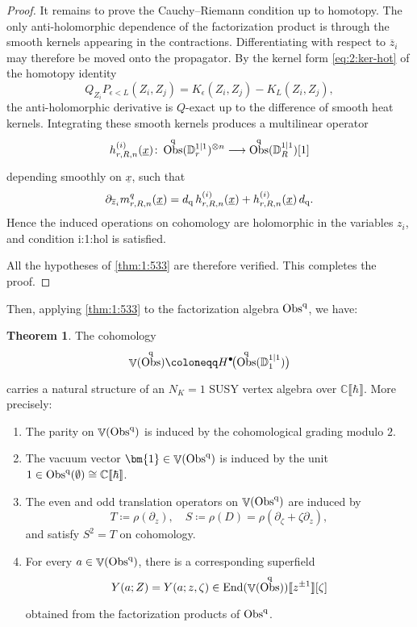 \documentclass[final,reqno]{amsart}
\numberwithin{equation}{section}
\theoremstyle{definition}
\newtheorem{thm}{Theorem}[section]
\newcommand{\ep}{\epsilon}
\newcommand{\ol}{\overline}
\newcommand{\ul}{\underline}
\newcommand{\ceq}{\coloneqq} %
\newcommand{\lto}{\longrightarrow}
\newcommand{\q}{\textup{q}}
\newcommand{\bbC}{\mathbb{C}}
\newcommand{\sD}{\mathbb{D}^{1|1}}
\newcommand{\pd}{\partial}
\newcommand{\vac}{\bm{1}}
\newcommand{\dbr}[1]{\llbracket #1 \rrbracket} %
\newcommand{\qObs}[1]{\mathop{\Obs^{\textup{q}}_{#1}}}
\DeclareMathOperator{\bbV}{\mathbb{V}}
\DeclareMathOperator{\End}{End}
\DeclareMathOperator{\Obs}{Obs}
\begin{document}
\begin{proof}
It remains to prove the Cauchy--Riemann condition up to homotopy. 
The only anti-holomorphic dependence of the factorization product is 
through the smooth kernels appearing in the contractions. 
Differentiating with respect to $\ol{z}_i$ 
may therefore be moved onto the propagator. 
By the kernel form \eqref{eq:2:ker-hot} of the homotopy identity
\[
 Q_{Z_i}P_{\ep<L}(Z_i,Z_j) = K_{\ep}(Z_i,Z_j)-K_L(Z_i,Z_j),
\]
the anti-holomorphic derivative is $Q$-exact 
up to the difference of smooth heat kernels. 
Integrating these smooth kernels produces a multilinear operator
\[
 h^{(i)}_{r,R,n}(\ul{x})\colon 
 \qObs{}(\sD_r)^{\otimes n} \lto \qObs{}(\sD_R)[1]
\]
depending smoothly on $\ul{x}$, such that
\[
 \pd_{\ol z_i}m^q_{r,R,n}(\ul{x}) = 
 d_{\q}\,h^{(i)}_{r,R,n}(\ul{x}) + h^{(i)}_{r,R,n}(\ul{x})\,d_{\q}.
\]
Hence the induced operations on cohomology are holomorphic 
in the variables $z_i$, and condition {i:1:hol} is satisfied.

All the hypotheses of \cref{thm:1:533} are therefore verified. 
This completes the proof.
\end{proof}

Then, applying \cref{thm:1:533} to the factorization algebra $\qObs{}$, 
we have:

\begin{thm}\label{thm:2:qObsVA}
The cohomology 
\[
 \bbV(\qObs{}) \ceq H^\bullet\!\bigl(\qObs{}(\sD_1)\bigr)
\]
carries a natural structure of 
an $N_K=1$ SUSY vertex algebra over $\bbC\dbr{\hbar}$.
More precisely:
\begin{enumerate}
\item 
The parity on $\bbV(\qObs{})$ 
is induced by the cohomological grading modulo $2$.

\item 
The vacuum vector $\vac\in \bbV(\qObs{})$
is induced by the unit $1\in \qObs{}(\emptyset)\cong \bbC\dbr{\hbar}$.

\item 
The even and odd translation operators on $\bbV(\qObs{})$ are induced by
\[
 T \ceq \rho(\pd_z), \quad
 S \ceq \rho(D) = \rho(\pd_\zeta+\zeta\pd_z),
\]
and satisfy $S^2=T$ on cohomology.

\item 
For every $a\in \bbV(\qObs{})$, there is a corresponding superfield
\[
 Y(a;Z)=Y(a;z,\zeta) \in \End(\bbV(\qObs{}))\dbr{z^{\pm1}}[\zeta]
\]
obtained from the factorization products of $\qObs{}$.
\end{enumerate}
\end{thm}
\end{document}
